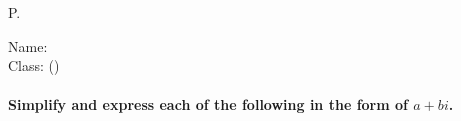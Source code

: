 \documentclass[11pt,a4paper, addpoints] {exam}
\begin{document}
\setlength\dottedlinefillheight{0.79cm}
\footer{}
       {P.\thepage}{}
\headrule 
\footrule

\printanswers %

		{}
		{\textsf{Name:} \underline{\hspace{2.85cm}}\\
                  \hfill \textsf{Class:} \underline{\hspace{1.8cm}}(\qquad)}
\pgfmathsetseed{\year} %
\paragraph*{Simplify and express each of the following in the form of $a+bi$.}
\end{document}
